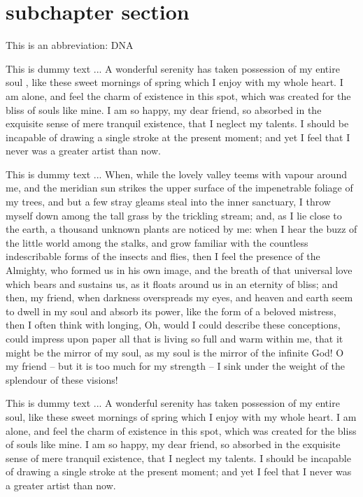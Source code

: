 \documentclass[letterpaper,oneside,12pt]{book}
\begin{document}
\section{subchapter section}\label{subchapter-section}


This is an abbreviation: DNA



This is dummy text ... A wonderful serenity has taken possession of my entire soul \cite{Bilen2005}, like these sweet mornings of spring which I enjoy with my whole heart. I am alone, and feel the charm of existence in this spot, which was created for the bliss of souls like mine. I am so happy, my dear friend, so absorbed in the exquisite sense of mere tranquil existence, that I neglect my talents. I should be incapable of drawing a single stroke at the present moment; and yet I feel that I never was a greater artist than now.



This is dummy text ... When, while the lovely valley teems with vapour around me, and the meridian sun strikes the upper surface of the impenetrable foliage of my trees, and but a few stray gleams steal into the inner sanctuary, I throw myself down among the tall grass by the trickling stream; and, as I lie close to the earth, a thousand unknown plants are noticed by me: when I hear the buzz of the little world among the stalks, and grow familiar with the countless indescribable forms of the insects and flies, then I feel the presence of the Almighty, who formed us in his own image, and the breath of that universal love which bears and sustains us, as it floats around us in an eternity of bliss; and then, my friend, when darkness overspreads my eyes, and heaven and earth seem to dwell in my soul and absorb its power, like the form of a beloved mistress, then I often think with longing, Oh, would I could describe these conceptions, could impress upon paper all that is living so full and warm within me, that it might be the mirror of my soul, as my soul is the mirror of the infinite God! O my friend -- but it is too much for my strength -- I sink under the weight of the splendour of these visions!



This is dummy text ... A wonderful serenity has taken possession of my entire soul, like these sweet mornings of spring which I enjoy with my whole heart. I am alone, and feel the charm of existence in this spot, which was created for the bliss of souls like mine. I am so happy, my dear friend, so absorbed in the exquisite sense of mere tranquil existence, that I neglect my talents. I should be incapable of drawing a single stroke at the present moment; and yet I feel that I never was a greater artist than now.
\end{document}
